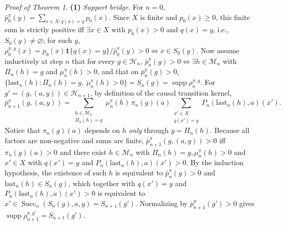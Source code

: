 \documentclass[11pt,a4paper]{article}
\begin{document}
\emph{Proof of Theorem 1.} \textbf{(1)} \emph{Support bridge.} For
\(n = 0\), \(\bar{p}_0^\pi(y) = \sum_{x \in X : q(x)=y} p_0(x)\). Since
\(X\) is finite and \(p_0(x) \ge 0\), this finite sum is strictly
positive iff \(\exists x \in X\) with \(p_0(x) > 0\) and \(q(x) = y\),
i.e., \(S_0(y) \neq \varnothing\); for such \(y\),
\(\rho_0^{\pi, y}(x) = p_0(x)\mathbf{1}\{q(x)=y\}/\bar{p}_0^\pi(y) > 0 \iff x \in S_0(y)\).
Now assume inductively at step \(n\) that for every
\(g \in \mathcal{H}_n\),
\(\bar{p}_n^\pi(g) > 0 \iff \exists h \in \mathcal{M}_n\) with
\(\Pi_n(h) = g\) and \(\mu_n^\pi(h) > 0\), and that on
\(\bar{p}_n^\pi(g) > 0\),
\(\{ \mathrm{last}_n(h) : \Pi_n(h)=g,\ \mu_n^\pi(h)>0 \} = S_n(g) = \operatorname{supp}\rho_n^{\pi,g}\).
For \(g' = (g, (a, y)) \in \mathcal{H}_{n+1}\), by definition of the
causal transition kernel,
\[\bar{p}_{n+1}^\pi(g, (a, y)) = \sum_{\substack{h \in \mathcal{M}_n \\ \Pi_n(h) = g}} \mu_n^\pi(h)\, \pi_n(g)(a) \sum_{\substack{x' \in X \\ q(x') = y}} P_n(\mathrm{last}_n(h), a)(x').\]
Notice that \(\pi_n(g)(a)\) depends on \(h\) \emph{only} through
\(g = \Pi_n(h)\). Because all factors are non-negative and sums are
finite, \(\bar{p}_{n+1}^\pi(g, (a, y)) > 0\) iff \(\pi_n(g)(a) > 0\) and
there exist \(h \in \mathcal{M}_n\) with
\(\Pi_n(h) = g, \mu_n^\pi(h) > 0\) and \(x' \in X\) with \(q(x') = y\)
and \(P_n(\mathrm{last}_n(h), a)(x') > 0\). By the induction hypothesis,
the existence of such \(h\) is equivalent to \(\bar{p}_n^\pi(g) > 0\)
and \(\mathrm{last}_n(h) \in S_n(g)\), which together with \(q(x') = y\)
and \(P_n(\mathrm{last}_n(h),a)(x') > 0\) is equivalent to
\(x' \in \operatorname{Succ}_n(S_n(g), a, y) = S_{n+1}(g')\).
Normalizing by \(\bar{p}_{n+1}^\pi(g') > 0\) gives
\(\operatorname{supp}\rho_{n+1}^{\pi, g'} = S_{n+1}(g')\).
\end{document}

